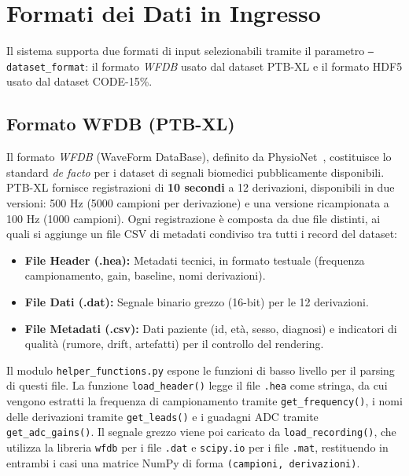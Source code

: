 \section{Formati dei Dati in Ingresso}

Il sistema supporta due formati di input selezionabili tramite il parametro \texttt{--dataset\_format}: il formato \textit{WFDB} usato dal dataset PTB-XL e il formato HDF5 usato dal dataset CODE-15\%.

\subsection{Formato WFDB (PTB-XL)}

Il formato \textit{WFDB} (WaveForm DataBase), definito da PhysioNet~\cite{PhysioNet-ptb-xl-1.0.3}, costituisce lo standard \textit{de facto} per i dataset di segnali biomedici pubblicamente disponibili. PTB-XL fornisce registrazioni di \textbf{10 secondi} a 12 derivazioni, disponibili in due versioni: 500 Hz (5000 campioni per derivazione) e una versione ricampionata a 100 Hz (1000 campioni). Ogni registrazione è composta da due file distinti, ai quali si aggiunge un file CSV di metadati condiviso tra tutti i record del dataset:

\begin{itemize}
    \item \textbf{File Header (.hea):} Metadati tecnici, in formato testuale (frequenza campionamento, gain, baseline, nomi derivazioni).
    \item \textbf{File Dati (.dat):} Segnale binario grezzo (16-bit) per le 12 derivazioni.
    \item \textbf{File Metadati (.csv):} Dati paziente (id, età, sesso, diagnosi) e indicatori di qualità (rumore, drift, artefatti) per il controllo del rendering.
\end{itemize}

Il modulo \texttt{helper\_functions.py} espone le funzioni di basso livello per il parsing di questi file. La funzione \texttt{load\_header()} legge il file \texttt{.hea} come stringa, da cui vengono estratti la frequenza di campionamento tramite \texttt{get\_frequency()}, i nomi delle derivazioni tramite \texttt{get\_leads()} e i guadagni ADC tramite \texttt{get\_adc\_gains()}. Il segnale grezzo viene poi caricato da \texttt{load\_recording()}, che utilizza la libreria \texttt{wfdb} per i file \texttt{.dat} e \texttt{scipy.io} per i file \texttt{.mat}, restituendo in entrambi i casi una matrice NumPy di forma \texttt{(campioni, derivazioni)}.

